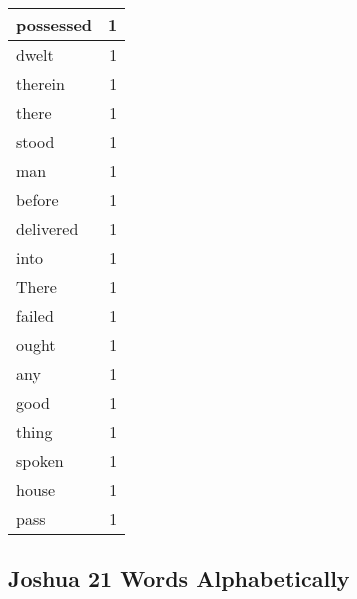 \begin{center}
\begin{longtable}{l|r}
possessed & 1\\ \hline 
dwelt & 1\\ \hline 
therein & 1\\ \hline 
there & 1\\ \hline 
stood & 1\\ \hline 
man & 1\\ \hline 
before & 1\\ \hline 
delivered & 1\\ \hline 
into & 1\\ \hline 
There & 1\\ \hline 
failed & 1\\ \hline 
ought & 1\\ \hline 
any & 1\\ \hline 
good & 1\\ \hline 
thing & 1\\ \hline 
spoken & 1\\ \hline 
house & 1\\ \hline 
pass & 1\\ \hline 
\end{longtable}
\end{center}





\subsection{Joshua 21 Words Alphabetically}


\normalsize
 
